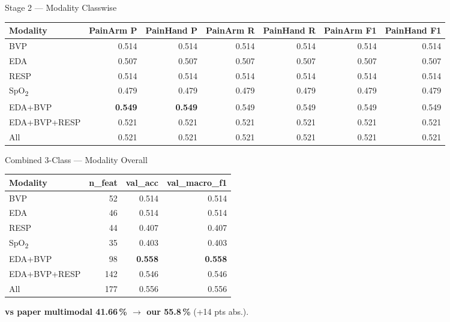 \documentclass[aspectratio=169,10pt]{beamer}
\begin{document}
\begin{frame}{Stage 2 --- Modality Classwise}
  \centering
  \scriptsize
  \begin{tabular}{lrrrrrr}
    \toprule
    \textbf{Modality} & \textbf{PainArm P} & \textbf{PainHand P} & \textbf{PainArm R} & \textbf{PainHand R} & \textbf{PainArm F1} & \textbf{PainHand F1} \\
    \midrule
    BVP          & 0.514 & 0.514 & 0.514 & 0.514 & 0.514 & 0.514 \\
    EDA          & 0.507 & 0.507 & 0.507 & 0.507 & 0.507 & 0.507 \\
    RESP         & 0.514 & 0.514 & 0.514 & 0.514 & 0.514 & 0.514 \\
    SpO\textsubscript{2} & 0.479 & 0.479 & 0.479 & 0.479 & 0.479 & 0.479 \\
    \rowcolor{green!15} EDA+BVP      & \textbf{0.549} & \textbf{0.549} & 0.549 & 0.549 & 0.549 & 0.549 \\
    EDA+BVP+RESP & 0.521 & 0.521 & 0.521 & 0.521 & 0.521 & 0.521 \\
    All          & 0.521 & 0.521 & 0.521 & 0.521 & 0.521 & 0.521 \\
    \bottomrule
  \end{tabular}
\end{frame}

\begin{frame}{Combined 3-Class --- Modality Overall}
  \centering
  \small
  \begin{tabular}{lrrr}
    \toprule
    \textbf{Modality} & \textbf{n\_feat} & \textbf{val\_acc} & \textbf{val\_macro\_f1} \\
    \midrule
    BVP          & 52  & 0.514 & 0.514 \\
    EDA          & 46  & 0.514 & 0.514 \\
    RESP         & 44  & 0.407 & 0.407 \\
    SpO\textsubscript{2} & 35  & 0.403 & 0.403 \\
    \rowcolor{green!15} EDA+BVP      & 98  & \textbf{0.558} & \textbf{0.558} \\
    EDA+BVP+RESP & 142 & 0.546 & 0.546 \\
    All          & 177 & 0.556 & 0.556 \\
    \bottomrule
  \end{tabular}

  \vspace{6pt}
  \textbf{vs paper multimodal 41.66\,\% $\rightarrow$ our 55.8\,\%} (+14 pts abs.).
\end{frame}
\end{document}
